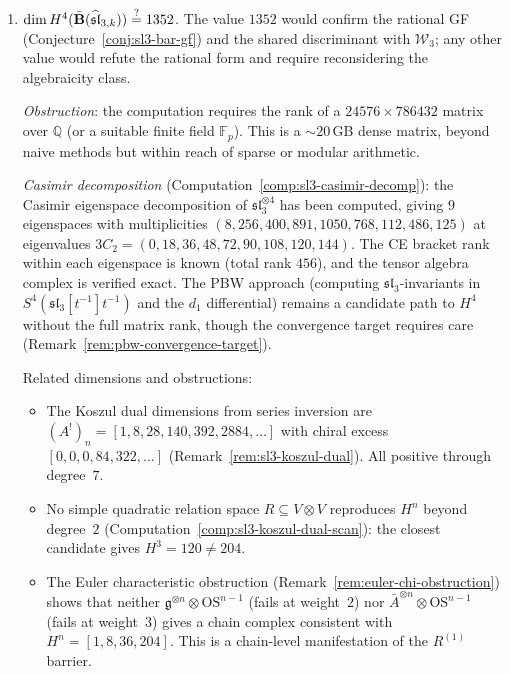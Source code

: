 \begin{enumerate}[label=\textbf{NF-\arabic*.}, leftmargin=3em]
\item\label{nf:sl3-h4}
\emph{$\dim H^4(\bar{\mathbf{B}}(\widehat{\mathfrak{sl}}_{3,k})) \stackrel{?}{=} 1352$.}
The value $1352$ would confirm the rational GF (Conjecture~\ref{conj:sl3-bar-gf}) and the shared discriminant with $\mathcal{W}_3$; any other value would refute the rational form and require reconsidering the algebraicity class.

\emph{Obstruction}: the computation requires the rank of a $24576 \times 786432$ matrix over $\mathbb{Q}$ (or a suitable finite field $\mathbb{F}_p$).  This is a $\sim 20$\,GB dense matrix, beyond naive methods but within reach of sparse or modular arithmetic.

\emph{Casimir decomposition} (Computation~\ref{comp:sl3-casimir-decomp}):
the Casimir eigenspace decomposition of $\mathfrak{sl}_3^{\otimes 4}$ has been
computed, giving $9$ eigenspaces with multiplicities
$(8, 256, 400, 891, 1050, 768, 112, 486, 125)$
at eigenvalues $3C_2 = (0, 18, 36, 48, 72, 90, 108, 120, 144)$.
The CE bracket rank within each eigenspace is known
(total rank $456$), and the tensor algebra complex is verified exact.
The PBW approach (computing $\mathfrak{sl}_3$-invariants in
$S^4(\mathfrak{sl}_3[t^{-1}]t^{-1})$ and the $d_1$ differential)
remains a candidate path to $H^4$ without the full matrix rank,
though the convergence target requires care
(Remark~\ref{rem:pbw-convergence-target}).

Related dimensions and obstructions:
\begin{itemize}
\item
The Koszul dual dimensions from series inversion are
$(A^!)_n = [1, 8, 28, 140, 392, 2884, \ldots]$
with chiral excess $[0, 0, 0, 84, 322, \ldots]$
(Remark~\ref{rem:sl3-koszul-dual}).
All positive through degree~$7$.
\item
No simple quadratic relation space $R \subseteq V \otimes V$
reproduces $H^n$ beyond degree~$2$
(Computation~\ref{comp:sl3-koszul-dual-scan}): the closest
candidate gives $H^3 = 120 \neq 204$.
\item
The Euler characteristic obstruction
(Remark~\ref{rem:euler-chi-obstruction}) shows that neither
$\mathfrak{g}^{\otimes n} \otimes \mathrm{OS}^{n-1}$ (fails at
weight~$2$) nor $\bar{A}^{\otimes n} \otimes \mathrm{OS}^{n-1}$
(fails at weight~$3$) gives a chain complex
consistent with $H^n = [1, 8, 36, 204]$.  This is a chain-level
manifestation of the $R^{(1)}$ barrier.
\end{itemize}


\end{enumerate}
